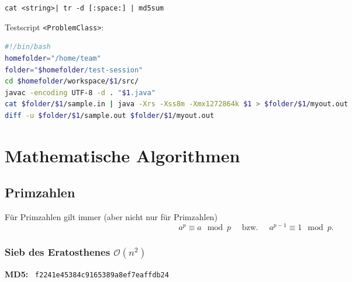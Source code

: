\documentclass[10pt,a4paper,ngerman,oneside,]{article}
\begin{document}
\begin{multicols}{2}
\thispagestyle{fancy}
\tableofcontents
\vfill
{}

\newcommand{\hash}[1]{{\bfseries MD5:} ~\texttt{#1}}
\vspace{2.5em} \texttt{cat <string>| tr -d [:space:] | md5sum}\\

\par\noindent Testscript \texttt{<ProblemClass>}:
\begin{lstlisting}[language=bash,mathescape=false]
#!/bin/bash
homefolder="/home/team"
folder="$homefolder/test-session"
cd $homefolder/workspace/$1/src/
javac -encoding UTF-8 -d . "$1.java"
cat $folder/$1/sample.in | java -Xrs -Xss8m -Xmx1272864k $1 > $folder/$1/myout.out
diff -u $folder/$1/sample.out $folder/$1/myout.out
\end{lstlisting}
\newpage

\section{Mathematische Algorithmen}
\subsection{Primzahlen}
Für Primzahlen gilt immer (aber nicht nur für Primzahlen)
\[a^p\equiv a\mod p \quad\text{ bzw. }\quad a^{p-1}\equiv 1 \mod p.\]
\subsubsection{Sieb des Eratosthenes $\mathcal O(n^2)$}
\hash{f2241e45384c9165389a8ef7eaffdb24}

\end{multicols}
\end{document}
